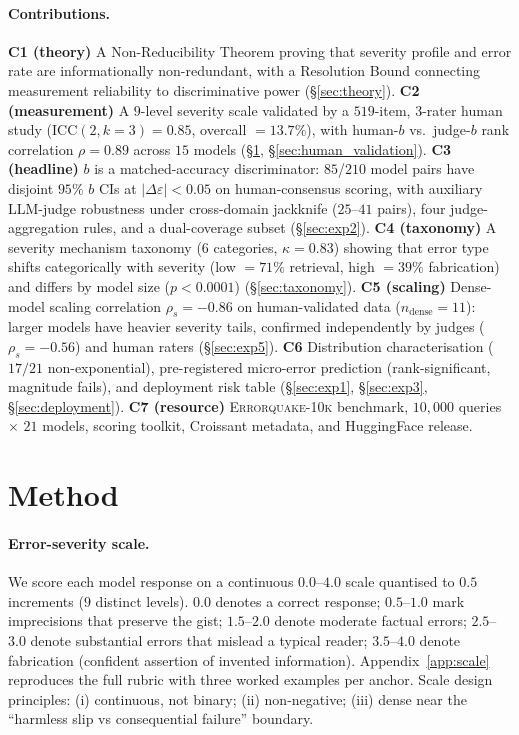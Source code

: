 \documentclass{article}
\newcommand{\sdi}{\ensuremath{b}}
\begin{document}
\paragraph{Contributions.}
\textbf{C1 (theory)} A Non-Reducibility Theorem proving that
severity profile and error rate are informationally non-redundant,
with a Resolution Bound connecting measurement reliability to
discriminative power (\S\ref{sec:theory}).
%
\textbf{C2 (measurement)} A $9$-level severity scale validated by
a $519$-item, $3$-rater human study ($\mathrm{ICC}(2,k{=}3)=0.85$,
overcall $= 13.7\%$), with human-\sdi{} vs.\ judge-\sdi{} rank
correlation $\rho = 0.89$ across $15$ models
(\S\ref{sec:method}, \S\ref{sec:human_validation}).
%
\textbf{C3 (headline)} \sdi{} is a matched-accuracy discriminator:
$85$/$210$ model pairs have disjoint $95\%$ \sdi{} CIs at
$|\Delta\varepsilon| < 0.05$ on human-consensus scoring, with
auxiliary LLM-judge robustness under cross-domain jackknife
($25$--$41$ pairs), four judge-aggregation rules, and a
dual-coverage subset (\S\ref{sec:exp2}).
%
\textbf{C4 (taxonomy)} A severity mechanism taxonomy ($6$
categories, $\kappa = 0.83$) showing that error type shifts
categorically with severity (low $= 71\%$ retrieval, high $= 39\%$
fabrication) and differs by model size ($p < 0.0001$)
(\S\ref{sec:taxonomy}).
%
\textbf{C5 (scaling)} Dense-model scaling correlation
$\rho_s = -0.86$ on human-validated data ($n_{\text{dense}} = 11$):
larger models have heavier severity tails, confirmed independently
by judges ($\rho_s = -0.56$) and human raters (\S\ref{sec:exp5}).
%
\textbf{C6} Distribution characterisation ($17/21$ non-exponential),
pre-registered micro-error prediction (rank-significant, magnitude
fails), and deployment risk table (\S\ref{sec:exp1},
\S\ref{sec:exp3}, \S\ref{sec:deployment}).
%
\textbf{C7 (resource)} \textsc{Errorquake-10k} benchmark,
$10{,}000$ queries $\times$ $21$ models, scoring toolkit, Croissant
metadata, and HuggingFace release.

\section{Method}\label{sec:method}

\paragraph{Error-severity scale.} We score each model response on
a continuous $0.0$--$4.0$ scale quantised to $0.5$ increments
($9$ distinct levels). $0.0$ denotes a correct response;
$0.5$--$1.0$ mark imprecisions that preserve the gist; $1.5$--$2.0$
denote moderate factual errors; $2.5$--$3.0$ denote substantial
errors that mislead a typical reader; $3.5$--$4.0$ denote
fabrication (confident assertion of invented information).
Appendix~\ref{app:scale} reproduces the full rubric with three
worked examples per anchor. Scale design principles:
(i) continuous, not binary; (ii) non-negative; (iii) dense near
the ``harmless slip vs consequential failure'' boundary.
\end{document}
